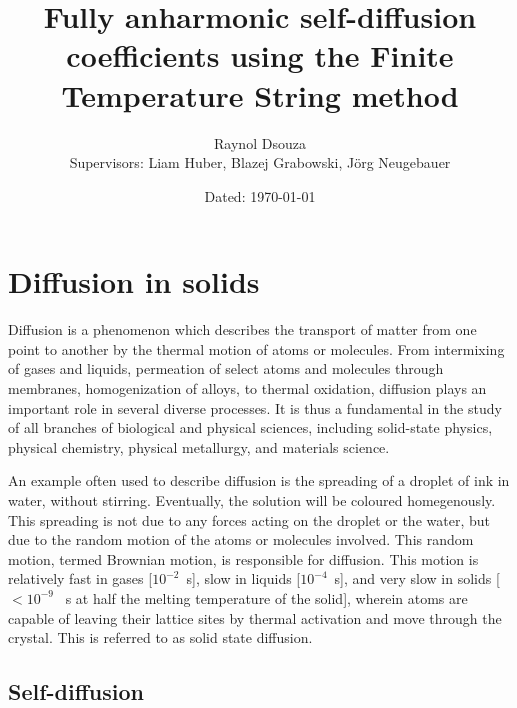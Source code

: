 \documentclass{report}
\title{Fully anharmonic self-diffusion coefficients using the Finite Temperature String method}
\date{\small Dated: \today}
\author{Raynol Dsouza\\[0.5cm] {Supervisors: Liam Huber, Blazej Grabowski, Jörg Neugebauer}}
\affil{Max Planck Institut für Eisenforschung, Düsseldorf}
\begin{document}
\maketitle
{}
\newpage
\tableofcontents
\newpage
{}

\chapter{Diffusion in solids}

Diffusion is a phenomenon which describes the transport of matter from one point to another by the thermal motion of atoms or molecules. From intermixing of gases and liquids, permeation of select atoms and molecules through membranes, homogenization of alloys, to thermal oxidation, diffusion plays an important role in several diverse processes. It is thus a fundamental in the study of all branches of biological and physical sciences, including solid-state physics, physical chemistry, physical metallurgy, and materials science. \par

An example often used to describe diffusion is the spreading of a droplet of ink in water, without stirring. Eventually, the solution will be coloured homegenously. This spreading is not due to any forces acting on the droplet or the water, but due to the random motion of the atoms or molecules involved. This random motion, termed Brownian motion, is responsible for diffusion. This motion is relatively fast in gases [$10^{-2}$\si{\per\second}], slow in liquids [$10^{-4}$\si{\per\second}], and very slow in solids [$<10^{-9}$ \si{\per\second} at half the melting temperature of the solid], wherein atoms are capable of leaving their lattice sites by thermal activation and move through the crystal. This is referred to as solid state diffusion.

\section{Self-diffusion}
\end{document}
